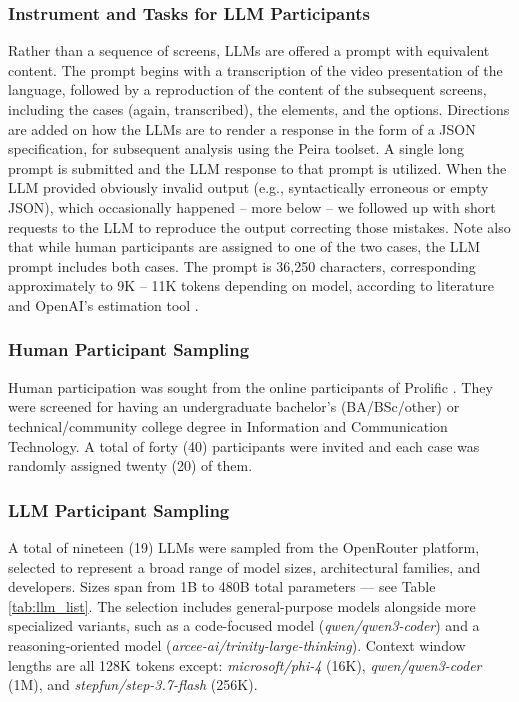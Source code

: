 \subsubsection{Instrument and Tasks for LLM Participants}
Rather than a sequence of screens, LLMs are offered a prompt with equivalent content. The prompt begins with a transcription of the video presentation of the language, followed by a reproduction of the content of the subsequent screens, including the cases (again, transcribed), the elements, and the options. Directions are added on how the LLMs are to render a response in the form of a JSON specification, for subsequent analysis using the Peira toolset. A single long prompt is submitted and the LLM response to that prompt is utilized. When the LLM provided obviously invalid output (e.g., syntactically erroneous or empty JSON), which occasionally happened -- more below -- we followed up with short requests to the LLM to reproduce the output correcting those mistakes. Note also that while human participants are assigned to one of the two cases, the LLM prompt includes both cases. The prompt is 36,250 characters, corresponding approximately to 9K -- 11K tokens depending on model, according to literature \cite{VHSB+24} and OpenAI's estimation tool \cite{OpenAI.tokenizer}.

\subsubsection{Human Participant Sampling}
Human participation was sought from the online participants of Prolific \cite{Prol.26}. They were screened for having an undergraduate bachelor's (BA/BSc/other) or technical/community college degree in Information and Communication Technology. A total of forty (40) participants were invited and each case was randomly assigned twenty (20) of them.

\subsubsection{LLM Participant Sampling}
A total of nineteen (19) LLMs were sampled from the OpenRouter \cite{openRouter} platform, selected to represent a broad range of model sizes, architectural families, and developers. Sizes span from 1B to 480B total parameters --- see Table \ref{tab:llm_list}. The selection includes general-purpose models alongside more specialized variants, such as a code-focused model (\textit{qwen/qwen3-coder}) and a reasoning-oriented model (\textit{arcee-ai/trinity-large-thinking}). Context window lengths are all 128K tokens except: \textit{microsoft/phi-4} (16K), \textit{qwen/qwen3-coder} (1M), and \textit{stepfun/step-3.7-flash} (256K). 


